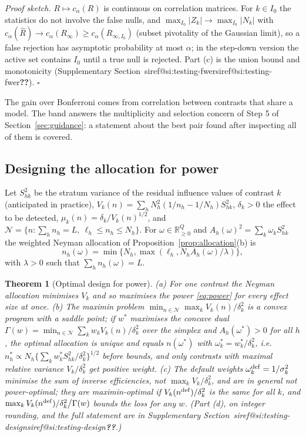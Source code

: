 \documentclass[pdflatex,sn-mathphys-num,iicol]{sn-jnl}
\makeatletter
\theoremstyle{thmstyleone}
\newtheorem{theorem}[proposition]{Theorem}
\theoremstyle{thmstyletwo}
\theoremstyle{thmstylethree}
\newcommand{\SIref}[1]{\ifcsname siref@#1\endcsname\csname siref@#1\endcsname\else\textbf{??}\fi}
\makeatother
\begin{document}
\emph{Proof sketch.} $R\mapsto c_\alpha(R)$ is continuous on correlation matrices. For $k\in I_0$ the statistics do not involve the false nulls, and $\max_{I_0}|Z_k|\to\max_{I_0}|N_k|$ with $c_\alpha(\hat R)\to c_\alpha(R_\infty)\ge c_\alpha(R_{\infty,I_0})$ (subset pivotality of the Gaussian limit), so a false rejection has asymptotic probability at most $\alpha$; in the step-down version the active set contains $I_0$ until a true null is rejected. Part (c) is the union bound and monotonicity (Supplementary Section~\SIref{si:testing-fwer}). $\square$

The gain over Bonferroni comes from correlation between contrasts that share a model. The band answers the multiplicity and selection concern of Step 5 of Section~\ref{sec:guidance}: a statement about the best pair found after inspecting all of them is covered.

\subsection{Designing the allocation for power}\label{sec:test-design}

Let $S^2_{hk}$ be the stratum variance of the residual influence values of contrast $k$ (anticipated in practice), $V_k(n)=\sum_hN_h^2(1/n_h-1/N_h)S^2_{hk}$, $\delta_k>0$ the effect to be detected, $\mu_k(n)=\delta_k/V_k(n)^{1/2}$, and $\mathcal N=\{n:\sum_hn_h=L,\ \ell_h\le n_h\le N_h\}$. For $\omega\in\mathbb R^Q_{\ge0}$ and $A_h(\omega)^2=\sum_k\omega_kS^2_{hk}$ the weighted Neyman allocation of Proposition~\ref{prop:allocation}(b) is
\begin{equation}\label{eq:n-omega}
n_h(\omega)=\min\{N_h,\max(\ell_h,N_hA_h(\omega)/\lambda)\},
\end{equation}
with $\lambda>0$ such that $\sum_hn_h(\omega)=L$.

\begin{theorem}[Optimal design for power]\label{thm:design}
(a) For one contrast the Neyman allocation minimises $V_k$ and so maximises the power \eqref{eq:power} for every effect size at once. (b) The maximin problem $\min_{n\in\mathcal N}\max_kV_k(n)/\delta_k^2$ is a convex program with a saddle point; if $w^\ast$ maximises the concave dual $\Gamma(w)=\min_{n\in\mathcal N}\sum_kw_kV_k(n)/\delta_k^2$ over the simplex and $A_h(\omega^\ast)>0$ for all $h$, the optimal allocation is unique and equals $n(\omega^\ast)$ with $\omega^\ast_k=w^\ast_k/\delta_k^2$, i.e.\ $n^\ast_h\propto N_h\{\sum_kw^\ast_kS^2_{hk}/\delta_k^2\}^{1/2}$ before bounds, and only contrasts with maximal relative variance $V_k/\delta_k^2$ get positive weight. (c) The default weights $\omega^{\rm def}_k=1/\sigma_k^2$ minimise the sum of inverse efficiencies, not $\max_kV_k/\delta_k^2$, and are in general \emph{not} power-optimal; they are maximin-optimal if $V_k(n^{\rm def})/\delta_k^2$ is the same for all $k$, and $\max_kV_k(n^{\rm def})/\delta_k^2\big/\Gamma(w)$ bounds the loss for any $w$. (Part (d), on integer rounding, and the full statement are in Supplementary Section~\SIref{si:testing-design}.)
\end{theorem}
\end{document}
